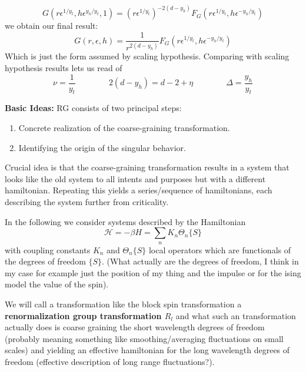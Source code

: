 	\begin{equation}
		G(r\epsilon^{1/y_t}, h\epsilon^{y_h / y_t}, 1) =	\left(r\epsilon^{1/y_t}\right)^{-2(d - y_h)} F_G(r \epsilon^{1/y_t}, h\epsilon^{- y_h / y_t})
	\end{equation}
	we obtain our final result:
	\begin{equation}
		G(r, \epsilon, h) =	\frac{1}{r^{2(d - y_h)}} F_G(r \epsilon^{1/y_t}, h \epsilon^{-y_h/ y_t})
	\end{equation}
	Which is just the form assumed by scaling hypothesis. Comparing with scaling hypothesis results lets us read of
	\begin{equation}
		\nu =	\frac{1}{y_t} \qquad \qquad 2(d - y_h) =	d - 2 + \eta \qquad\qquad \Delta = \frac{y_h}{y_t}
	\end{equation}
	
	\textbf{Basic Ideas:} RG consists of two principal steps:
	\begin{enumerate}
		\item Concrete realization of the coarse-graining transformation.
		\item Identifying the origin of the singular behavior.
	\end{enumerate}
	Crucial idea is that the coarse-graining transformation results in a system that looks like the old system to all intents and purposes but with a different hamiltonian. Repeating this yields a series/sequence of hamiltonians, each describing the system further from criticality.
	
	In the following we consider systems described by the Hamiltonian
	\begin{equation}
		\mathcal{H} =	- \beta H =	\sum_n K_n \Theta_n\lbrace S \rbrace
	\end{equation}
	with coupling constants $K_n$ and $\Theta_n \lbrace S \rbrace$ local operators which are functionals of the degrees of freedom $\lbrace S \rbrace$. (What actually are the degrees of freedom, I think in my case for example just the position of my thing and the impulse or for the ising model the value of the spin).
	
	We will call a transformation like the block spin transformation a \textbf{renormalization group transformation $R_l$} and what such an transformation actually does is coarse graining the short wavelength degrees of freedom (probably meaning something like smoothing/averaging fluctuations on small scales) and yielding an effective hamiltonian for the long wavelength degrees of freedom (effective description of long range fluctuations?).
	

